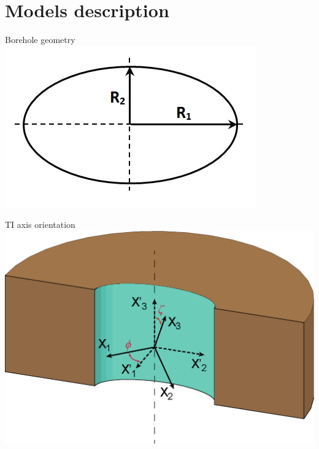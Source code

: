\documentclass[a4paper,11pt]{article}
\begin{document}
\section{Models description}

\begin{minipage}[c]{0.47\linewidth}	
\begin{center}
		Borehole geometry \\
		\includegraphics[width=1\linewidth]{./images/nonorth_alford/scheme_bh_image_hr.jpg}	  
\end{center}	  		
\end{minipage} \hfill
\begin{minipage}[c]{0.47\linewidth}
\begin{center}
		TI axis orientation\\
			\includegraphics[width=1\linewidth]{./images/nonorth_alford/TI_axes_desc.eps}		
\end{center}
\end{minipage}
\end{document}
